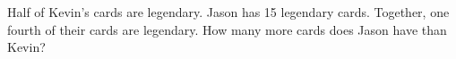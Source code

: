 Half of Kevin's cards are legendary. Jason has 15 legendary cards. Together, one fourth of their cards are legendary. How many more cards does Jason have than Kevin?

